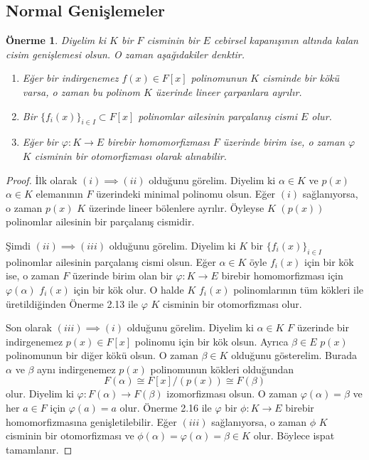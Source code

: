 \documentclass[draft]{article}
\newtheorem{prop}[thm]{Önerme}
\theoremstyle{definition}
\theoremstyle{remark}
\begin{document}
    	\subsection{Normal Genişlemeler}
    	
    	    \begin{prop}
    	        Diyelim ki $K$ bir $F$ cisminin bir $E$ cebirsel kapanışının altında kalan cisim genişlemesi olsun. O zaman aşağıdakiler denktir.
    	        \begin{enumerate}
				\renewcommand{\labelenumi}{(\roman{enumi})}
				    \item Eğer bir indirgenemez $f(x) \in F[x]$ polinomunun $K$ cisminde bir kökü varsa, o zaman bu polinom $K$ üzerinde lineer çarpanlara ayrılır.
				    \item Bir $\{f_i(x)\}_{i \in I} \subset F[x]$ polinomlar ailesinin parçalanış cismi $E$ olur.
				    \item Eğer bir $\varphi : K \to E$ birebir homomorfizması $F$ üzerinde birim ise, o zaman $\varphi$ $K$ cisminin bir otomorfizması olarak alınabilir.
				\end{enumerate}
    	    \end{prop}
    	    
    	    \begin{proof}
    	        İlk olarak $(i) \implies (ii)$ olduğunu görelim. Diyelim ki $\alpha \in K$ ve $p(x)$ $\alpha \in K$ elemanının $F$ üzerindeki minimal polinomu olsun. Eğer $(i)$ sağlanıyorsa, o zaman $p(x)$ $K$ üzerinde lineer bölenlere ayrılır. Öyleyse $K$ $(p(x))$ polinomlar ailesinin bir parçalanış cismidir.\par
    	        Şimdi $(ii) \implies (iii)$ olduğunu görelim. Diyelim ki $K$ bir $\{f_i(x)\}_{i \in I}$ polinomlar ailesinin parçalanış cismi olsun. Eğer $\alpha \in K$ öyle $f_i(x)$ için bir kök ise, o zaman $F$ üzerinde birim olan bir $\varphi: K \to E$ birebir homomorfizması için $\varphi(\alpha)$ $f_i(x)$ için bir kök olur. O halde $K$ $f_i(x)$ polinomlarının tüm kökleri ile üretildiğinden Önerme 2.13 ile $\varphi$ $K$ cisminin bir otomorfizması olur.\par
    	        Son olarak $(iii) \implies (i)$ olduğunu görelim. Diyelim ki $\alpha \in K$ $F$ üzerinde bir indirgenemez $p(x) \in F[x]$ polinomu için bir kök olsun. Ayrıca $\beta \in E$ $p(x)$ polinomunun bir diğer kökü olsun. O zaman $\beta \in K$ olduğunu gösterelim. Burada $\alpha$ ve $\beta$ aynı indirgenemez $p(x)$ polinomunun kökleri olduğundan
    	        \begin{equation*}
    	            F(\alpha) \cong F[x]/(p(x)) \cong F(\beta)
    	        \end{equation*}
    	        olur. Diyelim ki $\varphi: F(\alpha) \to F(\beta)$ izomorfizması olsun. O zaman $\varphi(\alpha) = \beta$ ve her $a \in F$ için $\varphi(a) = a$ olur. Önerme 2.16 ile $\varphi$ bir $\phi: K \to E$ birebir homomorfizmasına genişletilebilir. Eğer $(iii)$ sağlanıyorsa, o zaman $\phi$ $K$ cisminin bir otomorfizması ve $\phi(\alpha) = \varphi(\alpha) = \beta \in K$ olur. Böylece ispat tamamlanır.
    	    \end{proof}
    	    
\end{document}
